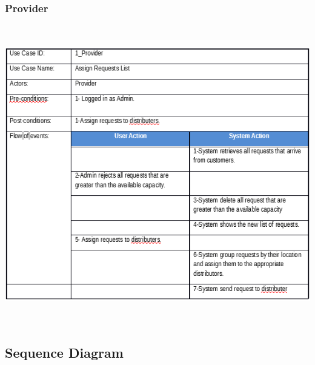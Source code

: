 \documentclass[12pt]{article}
\begin{document}
\subsubsection{ Provider }
\begin{center}
	\includegraphics[width=17cm,height=13cm]{./assets/usecasetable/provider-1.png}\\
\end{center}

\subsection{ Sequence Diagram }
\end{document}
